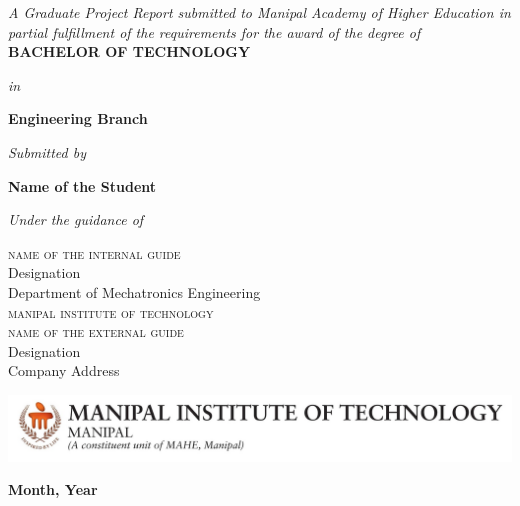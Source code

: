 \begin{titlepage}
    \begin{center}
        \textsc{\textbf{\Large{\thesistitle}}}
        
        \vspace{1.5cm}
        \textit{\large{A Graduate Project Report submitted to Manipal Academy of Higher Education in partial fulfillment of the requirements for the award of the degree of}}\\
        
        \vspace{2.5cm}
        {\textbf{\Large{{BACHELOR OF TECHNOLOGY}}}}
        
        \vspace{0.75cm}
        
        \textit{\large{in}}
        
        \vspace{0.75cm}
        \textbf{\Large{Engineering Branch}}
        
        \vspace{1.25cm}
        \textit{\large{Submitted by}}
        
        \vspace{1cm}
        \textbf{\Large{Name of the Student}}
        
        \vspace{1.5cm}
        \textit{\large{Under the guidance of}}
        
        \vspace{0.5cm}
        \begin{flushleft}
        \begin{multicols}{2}
            \textsc{\large{name of the internal guide}}\\
            \small{Designation\\
            Department of Mechatronics Engineering\\
            }
            \textsc{\large{manipal institute of technology}}\\
            
            \columnbreak
            \textsc{\large{name of the external guide}}\\
            \small{Designation\\
            Company Address\\
            }
        \end{multicols}
        \end{flushleft}
        
        \vspace{1.5cm}
        {\includegraphics[height=0.09\textheight, width=1\textwidth]{Figures/mit.jpg}}
        
        \vspace{0.5cm}
        \textbf{Month, Year}
        
    \end{center}
\end{titlepage}